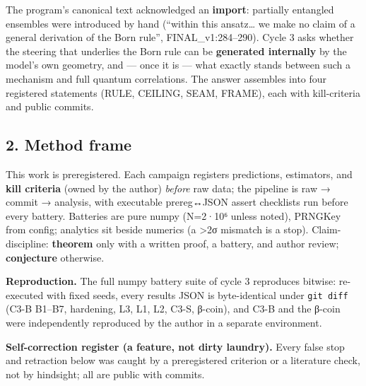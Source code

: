 \documentclass[
  11pt]{article}
\begin{document}
The program's canonical text acknowledged an \textbf{import}: partially
entangled ensembles were introduced by hand (``within this
ansatz\ldots{} we make no claim of a general derivation of the Born
rule'', FINAL\_v1:284--290). Cycle 3 asks whether the steering that
underlies the Born rule can be \textbf{generated internally} by the
model's own geometry, and --- once it is --- what exactly stands between
such a mechanism and full quantum correlations. The answer assembles
into four registered statements (RULE, CEILING, SEAM, FRAME), each with
kill-criteria and public commits.

\subsection{2. Method frame}\label{method-frame}

This work is preregistered. Each campaign registers predictions,
estimators, and \textbf{kill criteria} (owned by the author)
\emph{before} raw data; the pipeline is raw → commit → analysis, with
executable prereg↔JSON assert checklists run before every battery.
Batteries are pure numpy (N=2·10⁶ unless noted), PRNGKey from config;
analytics sit beside numerics (a \textgreater2σ mismatch is a stop).
Claim-discipline: \textbf{theorem} only with a written proof, a battery,
and author review; \textbf{conjecture} otherwise.

\textbf{Reproduction.} The full numpy battery suite of cycle 3
reproduces bitwise: re-executed with fixed seeds, every results JSON is
byte-identical under \texttt{git\ diff} (C3-B B1--B7, hardening, L3, L1,
L2, C3-S, β-coin), and C3-B and the β-coin were independently reproduced
by the author in a separate environment.

\textbf{Self-correction register (a feature, not dirty laundry).} Every
false stop and retraction below was caught by a preregistered criterion
or a literature check, not by hindsight; all are public with commits.
\end{document}
